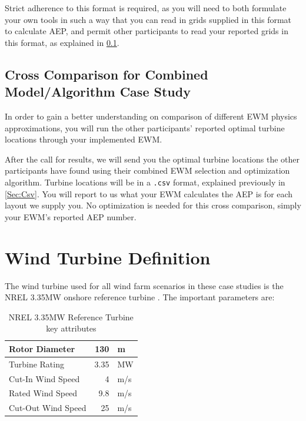 \documentclass[12pt]{article}
\begin{document}
    Strict adherence to this format is required, as you will need to both formulate your own tools in such a way that you can read in grids supplied in this format to calculate AEP, and permit other participants to read your reported grids in this format, as explained in \cref{Sec:CrossComp}. 
    
    \subsection{Cross Comparison for Combined Model/Algorithm Case Study}\label{Sec:CrossComp}
    In order to gain a better understanding on comparison of different EWM physics approximations, you will run the other participants' reported optimal turbine locations through your implemented EWM.
    
    After the call for results, we will send you the optimal turbine locations the other participants have found using their combined EWM selection and optimization algorithm. Turbine locations will be in a \texttt{.csv} format, explained previously in \cref{Sec:Csv}. You will report to us what your EWM calculates the AEP is for each layout we supply you. No optimization is needed for this cross comparison, simply your EWM's reported AEP number.

\newpage
\appendix
\section{Wind Turbine Definition} \label{App:NREL335MW}
    The wind turbine used for all wind farm scenarios in these case studies is the NREL 3.35MW onshore reference turbine \cite{NREL335MW}. The important parameters are:
    
    \begin{table}[H]
        \caption{NREL 3.35MW Reference Turbine key attributes \cite{NREL335MW}}
        \centering
        \begin{tabular}{|l|r l|}
            \hline
            Rotor Diameter & 130 & m \\ \hline
            Turbine Rating & 3.35 & MW \\ \hline
            Cut-In Wind Speed & 4 & m/s \\ \hline
            Rated Wind Speed & 9.8 & m/s \\ \hline
            Cut-Out Wind Speed & 25 & m/s \\
            \hline
        \end{tabular}
        \label{tab:my_label}
    \end{table}
    
\end{document}
